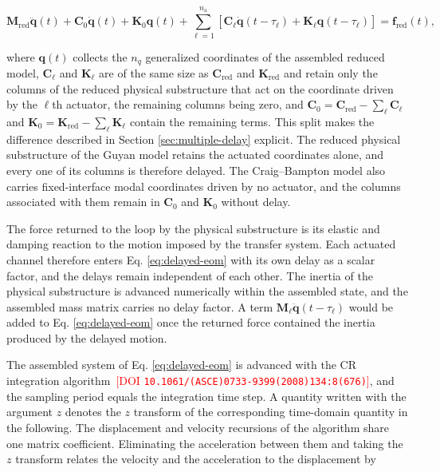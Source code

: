 \documentclass[a4paper,fleqn,review,12pt]{cas-sc}
\numberwithin{equation}{section}
\newcommand{\rev}[1]{\textcolor{red}{#1}}
\begin{document}
\vspace{-3.5em}
\begin{equation}
	\mathbf{M}_{\mathrm{red}}\ddot{\bm{q}}(t)+\mathbf{C}_{0}\dot{\bm{q}}(t)+\mathbf{K}_{0}\bm{q}(t)
	+\sum_{\ell=1}^{n_{\mathrm{a}}}
	\left[
	\mathbf{C}_{\ell}\dot{\bm{q}}(t-\tau_{\ell})
	+\mathbf{K}_{\ell}\bm{q}(t-\tau_{\ell})
	\right]
	=\bm{f}_{\mathrm{red}}(t),
	\label{eq:delayed-eom}
\end{equation}
\vspace{-3.5em}

\noindent where \(\bm{q}(t)\) collects the \(n_{q}\) generalized coordinates of the assembled reduced model, \(\mathbf{C}_{\ell}\) and \(\mathbf{K}_{\ell}\) are of the same size as \(\mathbf{C}_{\mathrm{red}}\) and \(\mathbf{K}_{\mathrm{red}}\) and retain only the columns of the reduced physical substructure that act on the coordinate driven by the \(\ell\)th actuator, the remaining columns being zero, and \(\mathbf{C}_{0}=\mathbf{C}_{\mathrm{red}}-\sum_{\ell}\mathbf{C}_{\ell}\) and \(\mathbf{K}_{0}=\mathbf{K}_{\mathrm{red}}-\sum_{\ell}\mathbf{K}_{\ell}\) contain the remaining terms. This split makes the difference described in Section \ref{sec:multiple-delay} explicit. The reduced physical substructure of the Guyan model retains the actuated coordinates alone, and every one of its columns is therefore delayed. The Craig--Bampton model also carries fixed-interface modal coordinates driven by no actuator, and the columns associated with them remain in \(\mathbf{C}_{0}\) and \(\mathbf{K}_{0}\) without delay.

The force returned to the loop by the physical substructure is its elastic and damping reaction to the motion imposed by the transfer system. Each actuated channel therefore enters Eq. \eqref{eq:delayed-eom} with its own delay as a scalar factor, and the delays remain independent of each other. The inertia of the physical substructure is advanced numerically within the assembled state, and the assembled mass matrix carries no delay factor. A term \(\mathbf{M}_{\ell}\ddot{\bm{q}}(t-\tau_{\ell})\) would be added to Eq. \eqref{eq:delayed-eom} once the returned force contained the inertia produced by the delayed motion.

The assembled system of Eq. \eqref{eq:delayed-eom} is advanced with the CR integration algorithm \cite{ChenRicles2008b}\,\rev{[DOI \nolinkurl{10.1061/(ASCE)0733-9399(2008)134:8(676)}]}, and the sampling period equals the integration time step. A quantity written with the argument \(z\) denotes the \(z\) transform of the corresponding time-domain quantity in the following. The displacement and velocity recursions of the algorithm share one matrix coefficient. Eliminating the acceleration between them and taking the \(z\) transform relates the velocity and the acceleration to the displacement by
\end{document}
